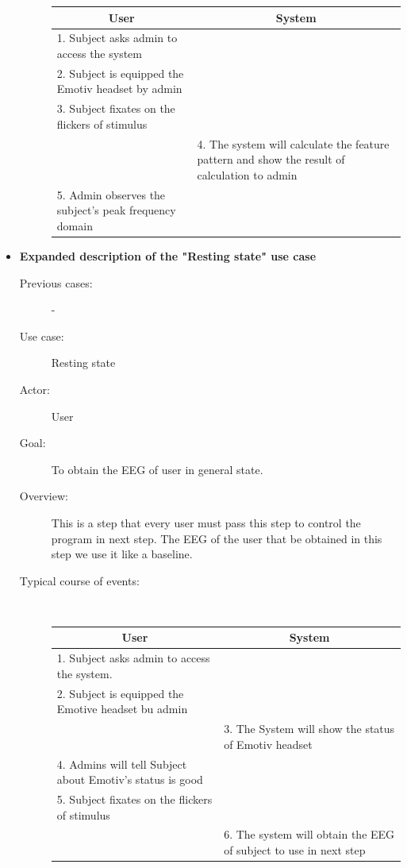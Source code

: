 \begin{itemize}
\begin{description}
	{
		\centering
		
		\begin{tabular}{| m{.47\linewidth} | m{.47\linewidth} |}
			
			\hline 
			\multicolumn{1}{|c}{\textbf{User}} & 
  			\multicolumn{1}{|c|}{\textbf{System}}\\
			\hline 
			1. Subject asks admin to access the system &   \\
			\hline 
			2. Subject is equipped the Emotiv headset by admin  &   \\
			\hline 
			3. Subject fixates on the flickers of stimulus & \\
			\hline 
			& 4. The system will calculate the feature pattern and show the result of calculation to admin  \\
			\hline
			5. Admin observes the subject’s peak frequency domain & \\
			\hline
			
		\end{tabular}
	}
	
\end{description}

\newpage
\item \textbf{Expanded description of the "Resting state" use case }
\begin{description}
	\item [Previous cases:] -
	\item [Use case:] Resting state
	\item [Actor:] User  
	\item [Goal:] To obtain the EEG of user in general state. 
	\item [Overview:] This is a step that every user must pass this step to control the program in next step. The EEG of the user that be obtained in this step we use it like a baseline. 
	\item [Typical course of events:]~
	
	{
		\centering
		\begin{tabular}{| m{.47\linewidth} | m{.47\linewidth} |}
			
			\hline 
			\multicolumn{1}{|c}{\textbf{User}} & 
  			\multicolumn{1}{|c|}{\textbf{System}}\\
			\hline 
			1. Subject asks admin to access the system. &   \\
			\hline 
			2. Subject is equipped the Emotive headset bu admin   &   \\
			\hline 
			& 3. The System will show the status of Emotiv headset \\
			\hline 
			4. Admins will tell Subject about Emotiv's status is good &  \\
			\hline
			5. Subject fixates on the flickers of stimulus &  \\
			\hline
			& 6. The system will obtain the EEG of subject to use in next step\\
			\hline
			

\end{tabular}}
\end{description}
\end{itemize}
